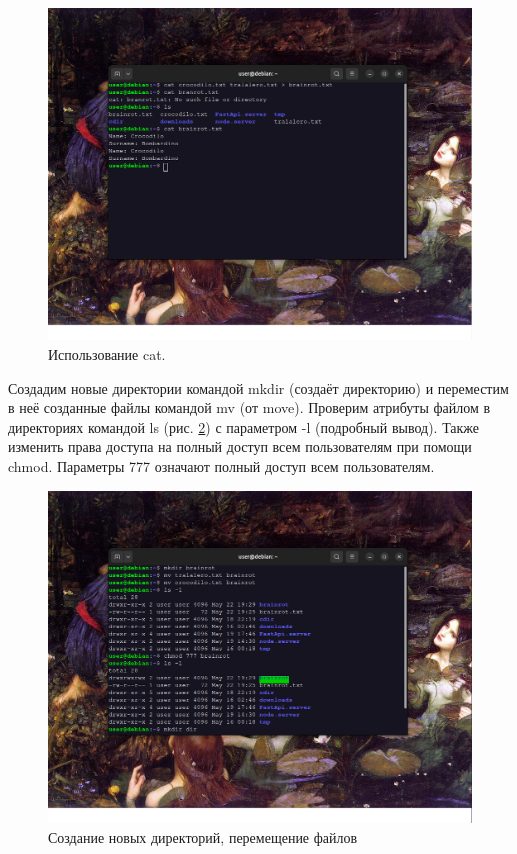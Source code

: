  \begin{figure}[h!]
     \centering
     \includegraphics[width=0.8\linewidth]{Pic/lab5/Снимок экрана от 2025-05-22 19-26-59.png}
     \caption{Использование cat.}
     \label{fig:catuse}
 \end{figure}
 \newpage
 Создадим новые директории командой mkdir (создаёт директорию) и переместим в неё созданные файлы командой mv (от move). Проверим атрибуты файлом в директориях командой ls (рис. \ref{fig:mkdirmv}) с параметром -l (подробный вывод). Также изменить права доступа на полный доступ всем пользователям при помощи chmod. Параметры 777 означают полный доступ всем пользователям.

 \begin{figure}[h!]
     \centering
     \includegraphics[width=0.8\linewidth]{Pic/lab5/Снимок экрана от 2025-05-22 19-38-15.png}
     \caption{Создание новых директорий, перемещение файлов}
     \label{fig:mkdirmv}
 \end{figure}

